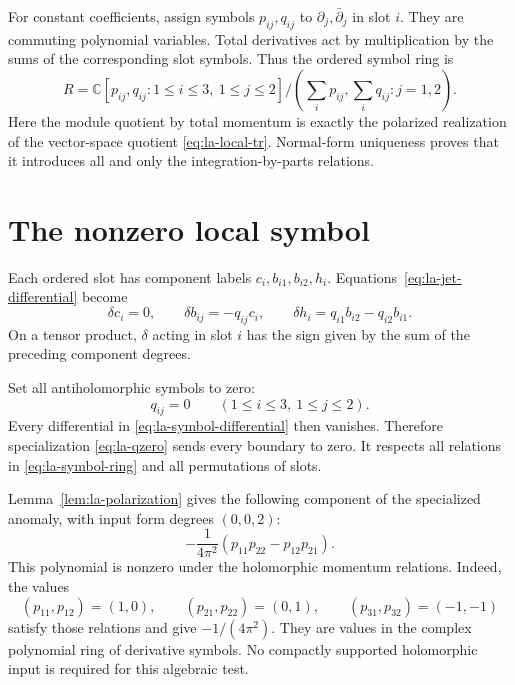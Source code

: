 For constant coefficients, assign symbols $p_{ij},q_{ij}$ to
$\partial_j,\bar\partial_j$ in slot $i$. They are commuting
polynomial variables. Total derivatives act by multiplication
by the sums of the corresponding slot symbols. Thus the ordered
symbol ring is
\begin{equation}\label{eq:la-symbol-ring}
 R=\mathbb C[p_{ij},q_{ij}:1\leq i\leq3,\ 1\leq j\leq2]
       \Big/\left(\sum_i p_{ij},\sum_iq_{ij}:j=1,2\right).
\end{equation}
Here the module quotient by total momentum is exactly the
polarized realization of the vector-space quotient
\eqref{eq:la-local-tr}. Normal-form uniqueness proves that it
introduces all and only the integration-by-parts relations.

\section{The nonzero local symbol}
\label{sec:la-symbol-obstruction}

Each ordered slot has component labels $c_i,b_{i1},b_{i2},h_i$.
Equations~\eqref{eq:la-jet-differential} become
\begin{equation}\label{eq:la-symbol-differential}
 \delta c_i=0,\qquad
 \delta b_{ij}=-q_{ij}c_i,\qquad
 \delta h_i=q_{i1}b_{i2}-q_{i2}b_{i1}.
\end{equation}
On a tensor product, $\delta$ acting in slot $i$ has the sign
given by the sum of the preceding component degrees.

Set all antiholomorphic symbols to zero:
\begin{equation}\label{eq:la-qzero}
 q_{ij}=0\qquad(1\leq i\leq3,\ 1\leq j\leq2).
\end{equation}
Every differential in \eqref{eq:la-symbol-differential} then
vanishes. Therefore specialization \eqref{eq:la-qzero} sends
every boundary to zero. It respects all relations in
\eqref{eq:la-symbol-ring} and all permutations of slots.

Lemma~\ref{lem:la-polarization} gives the following component of
the specialized anomaly, with input form degrees $(0,0,2)$:
\begin{equation}\label{eq:la-determinant-symbol}
 -\frac1{4\pi^2}(p_{11}p_{22}-p_{12}p_{21}).
\end{equation}
This polynomial is nonzero under the holomorphic momentum
relations. Indeed, the values
\[
 (p_{11},p_{12})=(1,0),\qquad
 (p_{21},p_{22})=(0,1),\qquad
 (p_{31},p_{32})=(-1,-1)
\]
satisfy those relations and give $-1/(4\pi^2)$.
They are values in the complex polynomial ring of derivative
symbols. No compactly supported holomorphic input is required
for this algebraic test.

